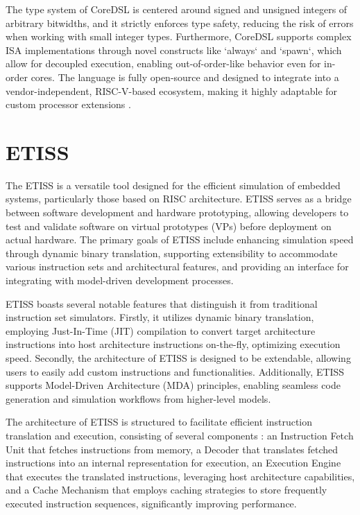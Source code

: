 The type system of CoreDSL is centered around signed and unsigned integers of arbitrary bitwidths, and it strictly enforces type safety, reducing the risk of errors when working with small integer types. Furthermore, CoreDSL supports complex ISA implementations through novel constructs like `always` and `spawn`, which allow for decoupled execution, enabling out-of-order-like behavior even for in-order cores. The language is fully open-source and designed to integrate into a vendor-independent, RISC-V-based ecosystem, making it highly adaptable for custom processor extensions \cite{CoreDSL}.

\section{ETISS}
The ETISS is a versatile tool designed for the efficient simulation of embedded systems, particularly those based on RISC architecture. ETISS serves as a bridge between software development and hardware prototyping, allowing developers to test and validate software on virtual prototypes (VPs) before deployment on actual hardware. The primary goals of ETISS include enhancing simulation speed through dynamic binary translation, supporting extensibility to accommodate various instruction sets and architectural features, and providing an interface for integrating with model-driven development processes.

ETISS boasts several notable features that distinguish it from traditional instruction set simulators. Firstly, it utilizes dynamic binary translation, employing Just-In-Time (JIT) compilation to convert target architecture instructions into host architecture instructions on-the-fly, optimizing execution speed. Secondly, the architecture of ETISS is designed to be extendable, allowing users to easily add custom instructions and functionalities. Additionally, ETISS supports Model-Driven Architecture (MDA) principles, enabling seamless code generation and simulation workflows from higher-level models.

The architecture of ETISS is structured to facilitate efficient instruction translation and execution, consisting of several components : an Instruction Fetch Unit that fetches instructions from memory, a Decoder that translates fetched instructions into an internal representation for execution, an Execution Engine that executes the translated instructions, leveraging host architecture capabilities, and a Cache Mechanism that employs caching strategies to store frequently executed instruction sequences, significantly improving performance.

